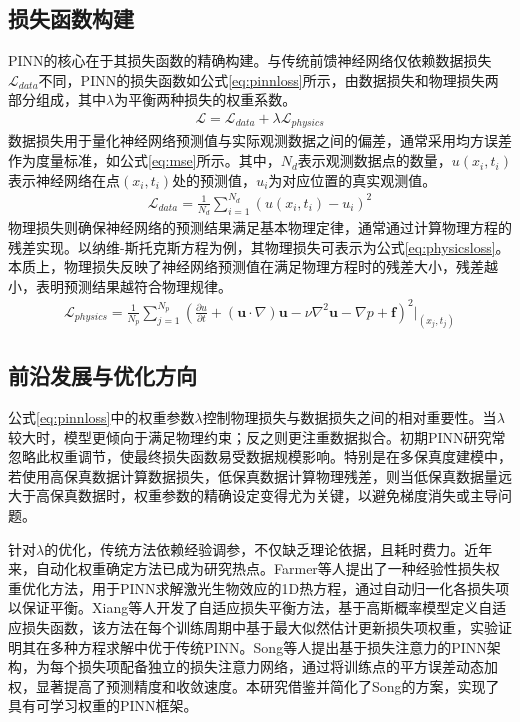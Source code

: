 \subsection{损失函数构建}
PINN的核心在于其损失函数的精确构建。与传统前馈神经网络仅依赖数据损失$\mathcal{L}_{data}$不同，PINN的损失函数如公式\eqref{eq:pinnloss}所示，由数据损失和物理损失两部分组成，其中$\lambda$为平衡两种损失的权重系数。
\begin{align}
  \mathcal{L} = \mathcal{L}_{data} + \lambda\mathcal{L}_{physics} \label{eq:pinnloss}
\end{align}
数据损失用于量化神经网络预测值与实际观测数据之间的偏差，通常采用均方误差作为度量标准，如公式\eqref{eq:mse}所示。其中，$N_d$表示观测数据点的数量，$u(x_i, t_i)$表示神经网络在点$(x_i, t_i)$处的预测值，$u_i$为对应位置的真实观测值。
\begin{align}
  \mathcal{L}_{data} = \frac{1}{N_d} \sum_{i=1}^{N_d} \left( u(x_i, t_i) - u_i \right)^2 \label{eq:mse}
\end{align}
物理损失则确保神经网络的预测结果满足基本物理定律，通常通过计算物理方程的残差实现。以纳维-斯托克斯方程为例，其物理损失可表示为公式\eqref{eq:physicsloss}。本质上，物理损失反映了神经网络预测值在满足物理方程时的残差大小，残差越小，表明预测结果越符合物理规律。
\begin{align}
  \mathcal{L}_{physics} = \frac{1}{N_p} \sum_{j=1}^{N_p} \left( \frac{\partial u}{\partial t} + (\mathbf{u} \cdot \nabla) \mathbf{u} - \nu \nabla^2 \mathbf{u} - \nabla p + \mathbf{f} \right)^2 \bigg|_{(x_j, t_j)} \label{eq:physicsloss}
\end{align}
\subsection{前沿发展与优化方向}
公式\eqref{eq:pinnloss}中的权重参数$\lambda$控制物理损失与数据损失之间的相对重要性。当$\lambda$较大时，模型更倾向于满足物理约束；反之则更注重数据拟合。初期PINN研究常忽略此权重调节，使最终损失函数易受数据规模影响。特别是在多保真度建模中，若使用高保真数据计算数据损失，低保真数据计算物理残差，则当低保真数据量远大于高保真数据时，权重参数的精确设定变得尤为关键，以避免梯度消失或主导问题\cite{luDeepXDEDeepLearning2021}。

针对$\lambda$的优化，传统方法依赖经验调参，不仅缺乏理论依据，且耗时费力。近年来，自动化权重确定方法已成为研究热点。Farmer等人提出了一种经验性损失权重优化方法，用于PINN求解激光生物效应的1D热方程\cite{farmerEmpiricalLossWeight2024}，通过自动归一化各损失项以保证平衡。Xiang等人开发了自适应损失平衡方法，基于高斯概率模型定义自适应损失函数\cite{xiangSelfadaptiveLossBalanced2022}，该方法在每个训练周期中基于最大似然估计更新损失项权重，实验证明其在多种方程求解中优于传统PINN。Song等人提出基于损失注意力的PINN架构，为每个损失项配备独立的损失注意力网络\cite{songLossattentionalPhysicsinformedNeural2024}，通过将训练点的平方误差动态加权，显著提高了预测精度和收敛速度。本研究借鉴并简化了Song的方案，实现了具有可学习权重的PINN框架。

